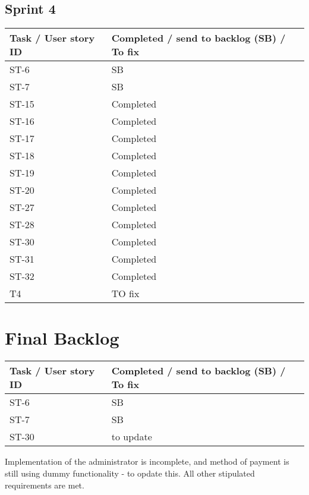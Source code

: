 \documentclass[12pt]{article}
\begin{document}
\subsection{Sprint 4}
{
\centering
\begin{longtable}{| p{7cm} | p{7cm}|}
			\hline			
			\textbf{Task / User story ID} & \textbf{Completed / send to backlog (SB) / To fix }
			
			\\ \hline
               ST-6 & SB \\ \hline
             \hline  ST-7 & SB
 \\ \hline
               ST-15 & Completed \\ \hline
             \hline  ST-16 & Completed \\ \hline 
             \hline  ST-17 & Completed \\ \hline
             \hline  ST-18 & Completed \\ \hline
             \hline  ST-19 & Completed \\ \hline
             \hline  ST-20 & Completed\\ \hline
             
             \hline  ST-27 & Completed \\ \hline
             \hline  ST-28 & Completed \\ \hline
             \hline  ST-30 & Completed \\ \hline
             \hline  ST-31 & Completed \\ \hline
             \hline  ST-32 & Completed \\ \hline
             \hline  T4 & TO fix \\ \hline
\end{longtable}
}
\section{Final Backlog}
{
\centering
\begin{longtable}{| p{7cm} | p{7cm}|}
			\hline			
			\textbf{Task / User story ID} & \textbf{Completed / send to backlog (SB) / To fix }
 \\ \hline
               ST-6 & SB \\ \hline
             \hline  ST-7 & SB
 \\ \hline
\hline  ST-30 & to update
 \\ \hline

\end{longtable}
}

\begin{flushleft}
Implementation of the administrator is incomplete, and method of payment is still using dummy functionality - to opdate this.  All other stipulated requirements are met.
\end{flushleft}
\end{document}
